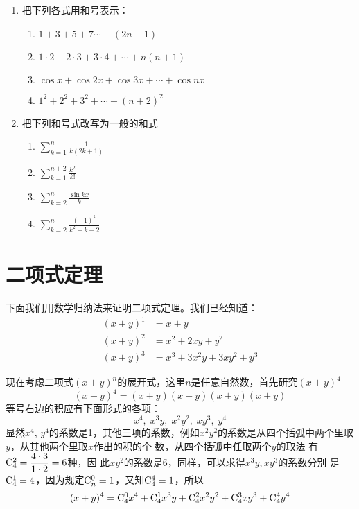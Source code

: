\begin{ex}
\begin{enumerate}
    \item 把下列各式用和号表示：
\begin{enumerate}[(1)]
\item $1+3+5+7\cdots+(2n-1)$ 
\item $1\cdot2+2\cdot3+3\cdot4+\cdots+n(n+1)$ 
\item $\cos x+\cos2x+\cos3x+\cdots+\cos nx$
\item $1^{2}+2^{2}+3^{2}+\cdots+(n+2)^{2}$
\end{enumerate}

\item 把下列和号式改写为一般的和式
\begin{multicols}{2}
\begin{enumerate}[(1)]
\item $\sum\limits _{k= 1}^{n}\frac 1{k( 2k+ 1) }$ 
\item $\sum\limits _{k= 1}^{n+ 2}\frac {k^{2}}{k! }$
\item $\sum\limits^n_{k=2}\frac{\sin kx}{k}$
\item $\sum\limits^n_{k=2}\frac{(-1)^k}{k^2+k-2}$
\end{enumerate}
\end{multicols}
\end{enumerate}
\end{ex}

\section{二项式定理}
下面我们用数学归纳法来证明二项式定理。我们已经知道：
\[\begin{split}
(x+y)^1&=x+y\\
(x+y)^2&=x^2+2xy+y^2\\
(x+y)^3&=x^3+3x^2y+3xy^2+y^3    
\end{split}\]

现在考虑二项式$(x+y)^n$的展开式，这里$n$是任意自然数，首先研究$(x+y)^4$
\[(x+y)^4=(x+y)(x+y)(x+y)(x+y)\]
等号右边的积应有下面形式的各项：
\[x^4,\; x^3y,\; x^2y^2,\; xy^3,\; y^4\]
显然$x^4$, $y^4$的系数是1，其他三项的系数，例如$x^2y^2$的系数是从四个括弧中两个里取$y$，从其他两个里取$x$作出的积的个
数，从四个括弧中任取两个$y$的取法 有${\rm C}^{2}_{4}=\dfrac{4\cdot 3}{1\cdot 2}=6$种，因
此$xy^2$的系数是6，同样，可以求得$x^3y,xy^3$的系数分别
是${\rm C}^{1}_{4}=4$，因为规定${\rm C}^{0}_{n}=1$，又知${\rm C}^{4}_{4}=1$，所以
\[(x+y)^4={\rm C}^{0}_{4}x^4+{\rm C}^{1}_{4}x^3y+{\rm C}^{2}_{4}x^2y^2+{\rm C}^{3}_{4}xy^3+{\rm C}^{4}_{4}y^4\]


